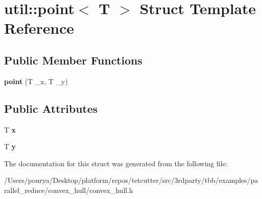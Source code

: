\hypertarget{structutil_1_1point}{}\section{util\+:\+:point$<$ T $>$ Struct Template Reference}
\label{structutil_1_1point}
\subsection*{Public Member Functions}
\begin{DoxyCompactItemize}
\item 
\hypertarget{structutil_1_1point_afb0c5fa8e027b70c59336725ef43640d}{}{\bfseries point} (T \+\_\+x, T \+\_\+y)\label{structutil_1_1point_afb0c5fa8e027b70c59336725ef43640d}

\end{DoxyCompactItemize}
\subsection*{Public Attributes}
\begin{DoxyCompactItemize}
\item 
\hypertarget{structutil_1_1point_ae0e71547c74b572799dc4200c6e4a6cf}{}T {\bfseries x}\label{structutil_1_1point_ae0e71547c74b572799dc4200c6e4a6cf}

\item 
\hypertarget{structutil_1_1point_a71c114ec6963f7a8dfcfdc69c05708ce}{}T {\bfseries y}\label{structutil_1_1point_a71c114ec6963f7a8dfcfdc69c05708ce}

\end{DoxyCompactItemize}


The documentation for this struct was generated from the following file\+:\begin{DoxyCompactItemize}
\item 
/\+Users/pourya/\+Desktop/platform/repos/tetcutter/src/3rdparty/tbb/examples/parallel\+\_\+reduce/convex\+\_\+hull/convex\+\_\+hull.\+h\end{DoxyCompactItemize}
